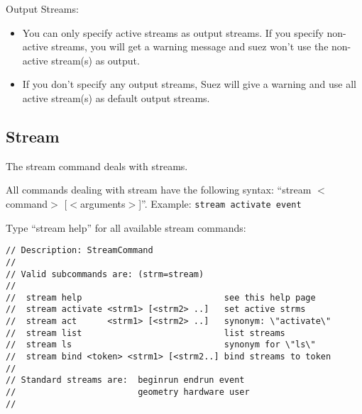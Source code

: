 \documentclass[12pt]{article}
\begin{document}
Output Streams:
\begin{itemize}

\item You can only specify active streams as output streams. If you
specify non-active streams, you will get a warning message and suez
won't use the non-active stream(s) as output.

\item If you don't specify any output streams, Suez will give a warning and
use all active stream(s) as default output streams.

\end{itemize}

\subsection{Stream }
\label{sec:StreamCommand}

The stream command deals with streams.

All commands dealing with stream have the following syntax:
\newline ``stream $<$command$>$ [$<$arguments$>$]''. 
\newline Example: \texttt{stream activate event}

\medskip
Type ``stream help'' for all available stream commands:
%
\begin{verbatim}
// Description: StreamCommand                                      
//                                                                 
// Valid subcommands are: (strm=stream)                            
//                                                                 
//  stream help                            see this help page         
//  stream activate <strm1> [<strm2> ..]   set active strms           
//  stream act      <strm1> [<strm2> ..]   synonym: \"activate\"      
//  stream list                            list streams               
//  stream ls                              synonym for \"ls\"         
//  stream bind <token> <strm1> [<strm2..] bind streams to token      
//                                                                 
// Standard streams are:  beginrun endrun event                    
//                        geometry hardware user                   
//                                                                  
\end{verbatim}
\end{document}
